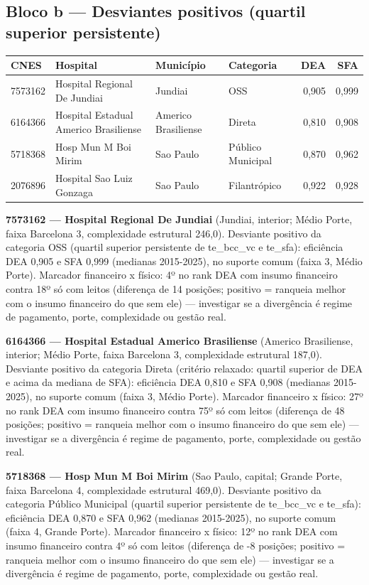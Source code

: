 \documentclass[12pt,a4paper]{article}
\begin{document}
\subsection{Bloco b --- Desviantes positivos (quartil superior persistente)}
\begin{center}\small
\begin{tabular}{llllrr}
\toprule
CNES & Hospital & Município & Categoria & DEA & SFA \\
\midrule
7573162 & Hospital Regional De Jundiai & Jundiai & OSS & 0,905 & 0,999 \\
6164366 & Hospital Estadual Americo Brasiliense & Americo Brasiliense & Direta & 0,810 & 0,908 \\
5718368 & Hosp Mun M Boi Mirim & Sao Paulo & Público Municipal & 0,870 & 0,962 \\
2076896 & Hospital Sao Luiz Gonzaga & Sao Paulo & Filantrópico & 0,922 & 0,928 \\
\bottomrule
\end{tabular}
\end{center}
\noindent\textbf{7573162 --- Hospital Regional De Jundiai} (Jundiai, interior; Médio Porte, faixa Barcelona 3, complexidade estrutural 246,0). Desviante positivo da categoria OSS (quartil superior persistente de te\_bcc\_vc e te\_sfa): eficiência DEA 0,905 e SFA 0,999 (medianas 2015-2025), no suporte comum (faixa 3, Médio Porte). Marcador financeiro x físico: 4º no rank DEA com insumo financeiro contra 18º só com leitos (diferença de 14 posições; positivo = ranqueia melhor com o insumo financeiro do que sem ele) — investigar se a divergência é regime de pagamento, porte, complexidade ou gestão real.\par\medskip
\noindent\textbf{6164366 --- Hospital Estadual Americo Brasiliense} (Americo Brasiliense, interior; Médio Porte, faixa Barcelona 3, complexidade estrutural 187,0). Desviante positivo da categoria Direta (critério relaxado: quartil superior de DEA e acima da mediana de SFA): eficiência DEA 0,810 e SFA 0,908 (medianas 2015-2025), no suporte comum (faixa 3, Médio Porte). Marcador financeiro x físico: 27º no rank DEA com insumo financeiro contra 75º só com leitos (diferença de 48 posições; positivo = ranqueia melhor com o insumo financeiro do que sem ele) — investigar se a divergência é regime de pagamento, porte, complexidade ou gestão real.\par\medskip
\noindent\textbf{5718368 --- Hosp Mun M Boi Mirim} (Sao Paulo, capital; Grande Porte, faixa Barcelona 4, complexidade estrutural 469,0). Desviante positivo da categoria Público Municipal (quartil superior persistente de te\_bcc\_vc e te\_sfa): eficiência DEA 0,870 e SFA 0,962 (medianas 2015-2025), no suporte comum (faixa 4, Grande Porte). Marcador financeiro x físico: 12º no rank DEA com insumo financeiro contra 4º só com leitos (diferença de -8 posições; positivo = ranqueia melhor com o insumo financeiro do que sem ele) — investigar se a divergência é regime de pagamento, porte, complexidade ou gestão real.\par\medskip
\end{document}
